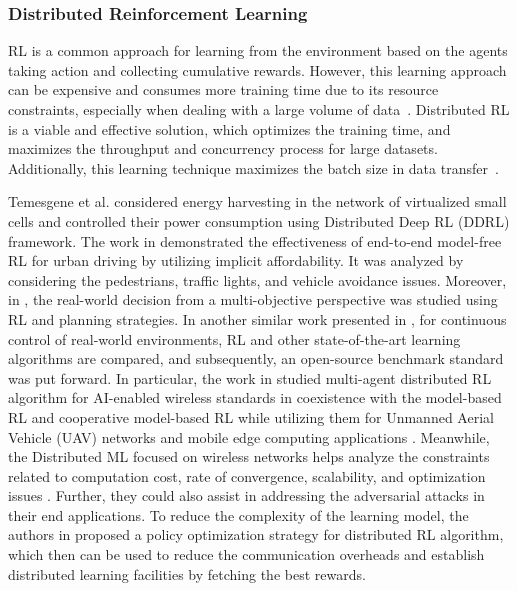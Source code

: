 \documentclass[journal]{IEEEtran}
\begin{document}
\subsubsection{Distributed Reinforcement Learning} 
RL is a common approach for learning from the environment based on the agents taking action and collecting cumulative rewards. However, this learning approach can be expensive and consumes more training time due to its resource constraints, especially when dealing with a large volume of data~\cite{luo2022reinforcement}. Distributed RL is a viable and effective solution, which optimizes the training time, and maximizes the throughput and concurrency process for large datasets. Additionally, this learning technique maximizes the batch size in data transfer~\cite{wang2022distributed}. 

Temesgene et al. \cite{temesgene2020distributed} considered energy harvesting in the network of virtualized small cells and controlled their power consumption using Distributed Deep RL (DDRL) framework. The work in \cite{toromanoff2020end} demonstrated the effectiveness of end-to-end model-free RL for urban driving by utilizing implicit affordability. It was analyzed by considering the pedestrians, traffic lights, and vehicle avoidance issues. Moreover, in \cite{hayes2021practical}, the real-world decision from a multi-objective perspective was studied using RL and planning strategies. In another similar work presented in \cite{dulac2021challenges}, for continuous control of real-world environments, RL and other state-of-the-art learning algorithms are compared, and subsequently, an open-source benchmark standard was put forward. In particular, the work in \cite{feriani2021single} studied multi-agent distributed RL algorithm for AI-enabled wireless standards in coexistence with the model-based RL and cooperative model-based RL while utilizing them for Unmanned Aerial Vehicle (UAV) networks \cite{yang2019energy} and mobile edge computing applications \cite{yang2019energyuav}. Meanwhile, the Distributed ML focused on wireless networks helps analyze the constraints related to computation cost, rate of convergence, scalability, and optimization issues \cite{hu2021distributed}. Further, they could also assist in addressing the adversarial attacks in their end applications. To reduce the complexity of the learning model, the authors in \cite{chen2021communication} proposed a policy optimization strategy for distributed RL algorithm, which then can be used to reduce the communication overheads and establish distributed learning facilities by fetching the best rewards. 
\end{document}

